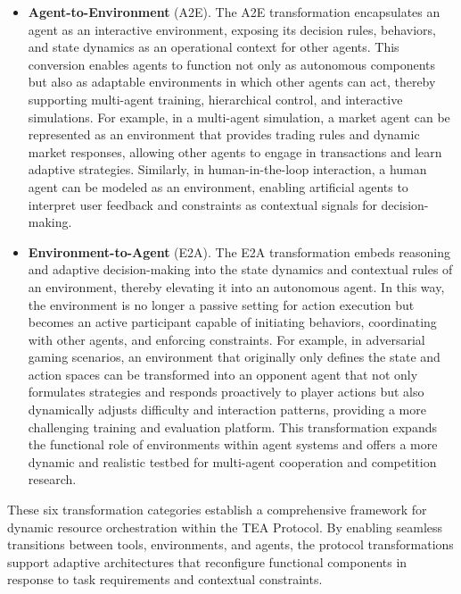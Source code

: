 \documentclass[11pt]{article}
\begin{document}
\begin{itemize}[leftmargin=*,itemsep=0.1em]
  \item \textbf{Agent-to-Environment} (A2E). The A2E transformation encapsulates an agent as an interactive environment, exposing its decision rules, behaviors, and state dynamics as an operational context for other agents. This conversion enables agents to function not only as autonomous components but also as adaptable environments in which other agents can act, thereby supporting multi-agent training, hierarchical control, and interactive simulations. For example, in a multi-agent simulation, a market agent can be represented as an environment that provides trading rules and dynamic market responses, allowing other agents to engage in transactions and learn adaptive strategies. Similarly, in human-in-the-loop interaction, a human agent can be modeled as an environment, enabling artificial agents to interpret user feedback and constraints as contextual signals for decision-making.
  
  \item \textbf{Environment-to-Agent} (E2A). The E2A transformation embeds reasoning and adaptive decision-making into the state dynamics and contextual rules of an environment, thereby elevating it into an autonomous agent. In this way, the environment is no longer a passive setting for action execution but becomes an active participant capable of initiating behaviors, coordinating with other agents, and enforcing constraints. For example, in adversarial gaming scenarios, an environment that originally only defines the state and action spaces can be transformed into an opponent agent that not only formulates strategies and responds proactively to player actions but also dynamically adjusts difficulty and interaction patterns, providing a more challenging training and evaluation platform. This transformation expands the functional role of environments within agent systems and offers a more dynamic and realistic testbed for multi-agent cooperation and competition research.
\end{itemize}

These six transformation categories establish a comprehensive framework for dynamic resource orchestration within the TEA Protocol. By enabling seamless transitions between tools, environments, and agents, the protocol transformations support adaptive architectures that reconfigure functional components in response to task requirements and contextual constraints.
\end{document}

